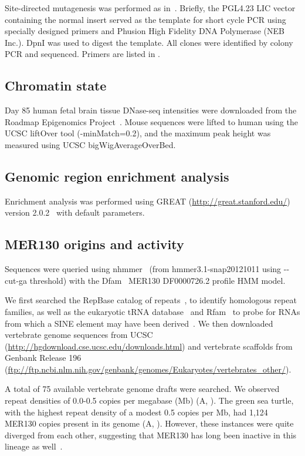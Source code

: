 Site-directed mutagenesis was performed as in~\citep{Camp:2012dh}.
Briefly, the PGL4.23 LIC vector containing the normal insert served as
the template for short cycle PCR using specially designed primers and
Phusion High Fidelity DNA Polymerase (NEB Inc.). DpnI was used to digest
the template. All clones were identified by colony PCR and sequenced.
Primers are listed in .

\subsection{Chromatin state}\label{chromatin-state}

Day 85 human fetal brain tissue DNase-seq intensities were downloaded
from the Roadmap Epigenomics Project~\citep{Bernstein:2010cw}. Mouse
sequences were lifted to human using the UCSC liftOver tool
(-minMatch=0.2), and the maximum peak height was measured using UCSC
bigWigAverageOverBed.

\subsection{Genomic region enrichment
analysis}\label{genomic-region-enrichment-analysis}

Enrichment analysis was performed using GREAT
(\url{http://great.stanford.edu/}) version 2.0.2~\citep{McLean:2010iq}
with default parameters.

\subsection{MER130 origins and activity}

Sequences were queried using nhmmer~\citep{Wheeler:2013gj} (from
hmmer3.1-snap20121011 using -\/-cut-ga threshold) with the
Dfam~\citep{Wheeler:2012im} MER130 DF0000726.2 profile HMM model.

We first searched the RepBase catalog of repeats~\citep{Jurka:2005bl}, to
identify homologous repeat families, as well as the eukaryotic tRNA
database~\citep{Chan:2009dz} and Rfam~\citep{Burge:2013bs} to probe for
RNAs from which a SINE element may have been
derived~\citep{Bejerano:2006ep}. We then downloaded vertebrate genome
sequences from UCSC
(\url{http://hgdownload.cse.ucsc.edu/downloads.html})
and vertebrate scaffolds from Genbank Release 196
(\url{ftp://ftp.ncbi.nlm.nih.gov/genbank/genomes/Eukaryotes/vertebrates\_other/}).

A total of 75 available vertebrate genome drafts were searched. We
observed repeat densities of 0.0-0.5 copies per megabase (Mb) (A,
). The green sea turtle, with the highest repeat
density of a modest 0.5 copies per Mb, had 1,124 MER130 copies present
in its genome (A, ). However, these instances
were quite diverged from each other, suggesting that MER130 has long
been inactive in this lineage as well~\citep{Bejerano:2006ep, Kazazian:2004bf}.
